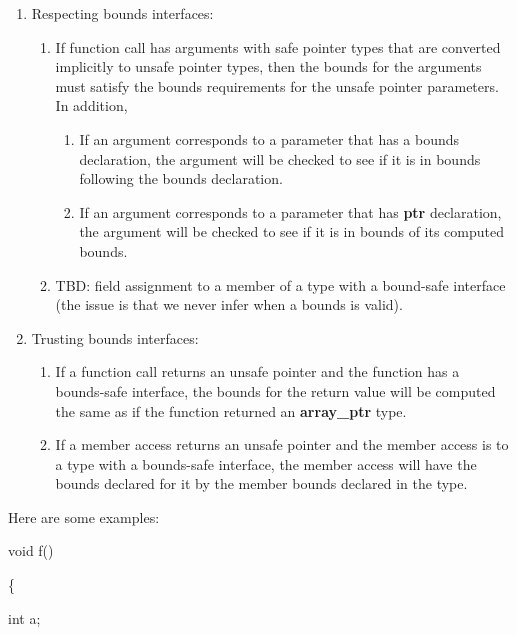 \begin{enumerate}
\def\labelenumi{\arabic{enumi}.}
\item
  Respecting bounds interfaces:

  \begin{enumerate}
  \def\labelenumii{\alph{enumii}.}
  \item
    If function call has arguments with safe pointer types that are
    converted implicitly to unsafe pointer types, then the bounds for
    the arguments must satisfy the bounds requirements for the unsafe
    pointer parameters. In addition,

    \begin{enumerate}
    \def\labelenumiii{\roman{enumiii}.}
    \item
      If an argument corresponds to a parameter that has a bounds
      declaration, the argument will be checked to see if it is in
      bounds following the bounds declaration.
    \item
      If an argument corresponds to a parameter that has \textbf{ptr}
      declaration, the argument will be checked to see if it is in
      bounds of its computed bounds.
    \end{enumerate}
  \item
    TBD: field assignment to a member of a type with a bound-safe
    interface (the issue is that we never infer when a bounds is valid).
  \end{enumerate}
\item
  Trusting bounds interfaces:

  \begin{enumerate}
  \def\labelenumii{\alph{enumii}.}
  \item
    If a function call returns an unsafe pointer and the function has a
    bounds-safe interface, the bounds for the return value will be
    computed the same as if the function returned an \textbf{array\_ptr}
    type.
  \item
    If a member access returns an unsafe pointer and the member access
    is to a type with a bounds-safe interface, the member access will
    have the bounds declared for it by the member bounds declared in the
    type.
  \end{enumerate}
\end{enumerate}

Here are some examples:

void f()

\{

int a;

